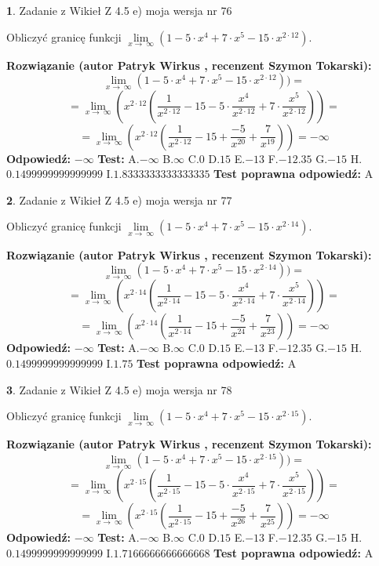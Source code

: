 \documentclass[12pt, a4paper]{article}
\theoremstyle{definition} %
\newtheorem{zad}{}
\newcommand{\zadStart}[1]{\begin{zad}#1\newline}
\newcommand{\zadStop}{\end{zad}}
\newcommand{\rozwStart}[2]{\noindent \textbf{Rozwiązanie (autor #1 , recenzent #2): }\newline}
\newcommand{\rozwStop}{\newline}
\newcommand{\odpStart}{\noindent \textbf{Odpowiedź:}\newline}
\newcommand{\odpStop}{\newline}
\newcommand{\testStart}{\noindent \textbf{Test:}\newline}
\newcommand{\testStop}{\newline}
\newcommand{\kluczStart}{\noindent \textbf{Test poprawna odpowiedź:}\newline}
\newcommand{\kluczStop}{\newline}
\begin{document}
\zadStart{Zadanie z Wikieł Z 4.5 e) moja wersja nr 76}


Obliczyć granicę funkcji  $\lim\limits_{x\to\ \infty}(1 - 5 \cdot x^{4}+7 \cdot x^{5}- 15 \cdot x^{2\cdot12})$.
\zadStop
\rozwStart{Patryk Wirkus}{Szymon Tokarski}
$$\lim\limits_{x\to\ \infty}(1 - 5 \cdot x^{4}+7 \cdot x^{5}- 15 \cdot x^{2\cdot12}))=$$
$$=\lim\limits_{x\to\ \infty}(x^{2\cdot12}(\frac{1}{x^{2\cdot12}}-15 -5 \cdot \frac{x^{4}}{x^{2\cdot12}}+7 \cdot \frac{x^{5}}{x^{2\cdot12}}))=$$
$$=\lim\limits_{x\to\ \infty}(x^{2\cdot12}(\frac{1}{x^{2\cdot12}}-15 + \frac{-5}{x^{20}}+ \frac{7}{x^{19}}))=-\infty$$
\rozwStop
\odpStart
$-\infty$
\odpStop
\testStart
A.$-\infty$ B.$\infty$ C.$0$ D.$15$ E.$-13$
F.$-12.35$ G.$-15$
H.$0.1499999999999999$
I.$1.8333333333333335$
\testStop
\kluczStart
A
\kluczStop



\zadStart{Zadanie z Wikieł Z 4.5 e) moja wersja nr 77}


Obliczyć granicę funkcji  $\lim\limits_{x\to\ \infty}(1 - 5 \cdot x^{4}+7 \cdot x^{5}- 15 \cdot x^{2\cdot14})$.
\zadStop
\rozwStart{Patryk Wirkus}{Szymon Tokarski}
$$\lim\limits_{x\to\ \infty}(1 - 5 \cdot x^{4}+7 \cdot x^{5}- 15 \cdot x^{2\cdot14}))=$$
$$=\lim\limits_{x\to\ \infty}(x^{2\cdot14}(\frac{1}{x^{2\cdot14}}-15 -5 \cdot \frac{x^{4}}{x^{2\cdot14}}+7 \cdot \frac{x^{5}}{x^{2\cdot14}}))=$$
$$=\lim\limits_{x\to\ \infty}(x^{2\cdot14}(\frac{1}{x^{2\cdot14}}-15 + \frac{-5}{x^{24}}+ \frac{7}{x^{23}}))=-\infty$$
\rozwStop
\odpStart
$-\infty$
\odpStop
\testStart
A.$-\infty$ B.$\infty$ C.$0$ D.$15$ E.$-13$
F.$-12.35$ G.$-15$
H.$0.1499999999999999$
I.$1.75$
\testStop
\kluczStart
A
\kluczStop



\zadStart{Zadanie z Wikieł Z 4.5 e) moja wersja nr 78}


Obliczyć granicę funkcji  $\lim\limits_{x\to\ \infty}(1 - 5 \cdot x^{4}+7 \cdot x^{5}- 15 \cdot x^{2\cdot15})$.
\zadStop
\rozwStart{Patryk Wirkus}{Szymon Tokarski}
$$\lim\limits_{x\to\ \infty}(1 - 5 \cdot x^{4}+7 \cdot x^{5}- 15 \cdot x^{2\cdot15}))=$$
$$=\lim\limits_{x\to\ \infty}(x^{2\cdot15}(\frac{1}{x^{2\cdot15}}-15 -5 \cdot \frac{x^{4}}{x^{2\cdot15}}+7 \cdot \frac{x^{5}}{x^{2\cdot15}}))=$$
$$=\lim\limits_{x\to\ \infty}(x^{2\cdot15}(\frac{1}{x^{2\cdot15}}-15 + \frac{-5}{x^{26}}+ \frac{7}{x^{25}}))=-\infty$$
\rozwStop
\odpStart
$-\infty$
\odpStop
\testStart
A.$-\infty$ B.$\infty$ C.$0$ D.$15$ E.$-13$
F.$-12.35$ G.$-15$
H.$0.1499999999999999$
I.$1.7166666666666668$
\testStop
\kluczStart
A
\kluczStop
\end{document}
